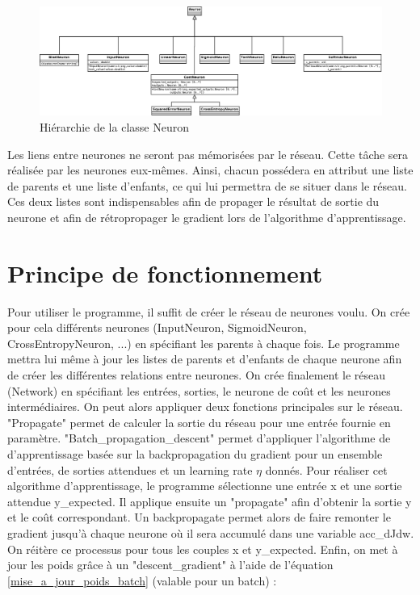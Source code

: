 \begin{figure}
\begin{center}
\includegraphics[scale=0.18]{images/uml_neurone_imp1.png}
\caption{Hiérarchie de la classe Neuron}
\label{uml_neurone_imp1}
\end{center}
\end{figure}


Les liens entre neurones ne seront pas mémorisées par le réseau. Cette tâche sera réalisée par les neurones eux-mêmes. Ainsi, chacun possédera en attribut une liste de parents et une liste d'enfants, ce qui lui permettra de se situer dans le réseau. Ces deux listes sont indispensables afin de propager le résultat de sortie du neurone et afin de rétropropager le gradient lors de l'algorithme d'apprentissage.
	
\section{Principe de fonctionnement}
Pour utiliser le programme, il suffit de créer le réseau de neurones voulu. On crée pour cela différents neurones (InputNeuron, SigmoidNeuron, CrossEntropyNeuron, ...) en spécifiant les parents à chaque fois. Le programme mettra lui même à jour les listes de parents et d'enfants de chaque neurone afin de créer les différentes relations entre neurones. On crée finalement le réseau (Network) en spécifiant les entrées, sorties, le neurone de coût et les neurones intermédiaires.
On peut alors appliquer deux fonctions principales sur le réseau. "Propagate" permet de calculer la sortie du réseau pour une entrée fournie en paramètre. "Batch\_propagation\_descent" permet d'appliquer l'algorithme de d'apprentissage basée sur la backpropagation du gradient pour un ensemble d'entrées, de sorties attendues et un learning rate $\eta$ donnés. 
Pour réaliser cet algorithme d'apprentissage, le programme sélectionne une entrée x et une sortie attendue y\_expected. Il applique ensuite un "propagate" afin d'obtenir la sortie y et le coût correspondant. Un backpropagate permet alors de faire remonter le gradient jusqu'à chaque neurone où il sera accumulé dans une variable acc\_dJdw. On réitère ce processus pour tous les couples x et y\_expected. Enfin, on met à jour les poids grâce à un "descent\_gradient" à l'aide de l'équation \ref{mise_a_jour_poids_batch} (valable pour un batch) :

